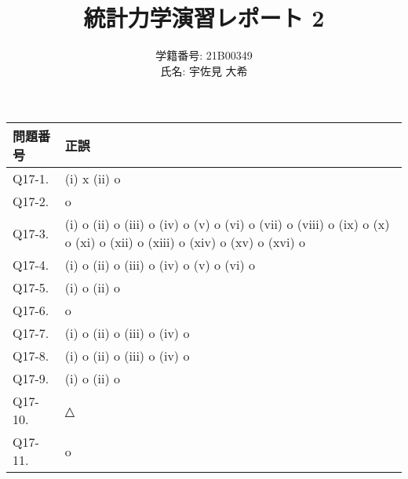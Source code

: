 \documentclass[uplatex,dvipdfmx,a4paper,11pt]{jlreq}
\theoremstyle{definition}
\begin{document}
\title{統計力学演習レポート 2}
\author{
  学籍番号: 21B00349\\
  氏名: 宇佐見 大希\\
}
\maketitle
\tableofcontents
\clearpage


\begin{table}[hbtp]
  \label{table:data_type}
  \centering
  \begin{tabular}{ll}
    \hline
    問題番号     & 正誤                                                                                                                    \\
    \hline \hline
    Q17-1.   & (i) x (ii) o                                                                                                          \\
    Q17-2.   & o                                                                                                                     \\
    Q17-3.   & (i) o (ii) o (iii) o (iv) o (v) o (vi) o (vii) o (viii) o (ix) o (x) o (xi) o (xii) o (xiii) o (xiv) o (xv) o (xvi) o \\
    Q17-4.   & (i) o (ii) o (iii) o (iv) o (v) o (vi) o                                                                              \\
    Q17-5.   & (i) o (ii) o                                                                                                          \\
    Q17-6.   & o                                                                                                                     \\
    Q17-7.   & (i) o (ii) o (iii) o (iv) o                                                                                           \\
    Q17-8.   & (i) o (ii) o (iii) o (iv) o                                                                                           \\
    Q17-9.   & (i) o (ii) o                                                                                                          \\
    Q17-10.  & △                                                                                                                     \\
    Q17-11.  & o                                                                                                                     \\

\end{tabular}
\end{table}
\end{document}

